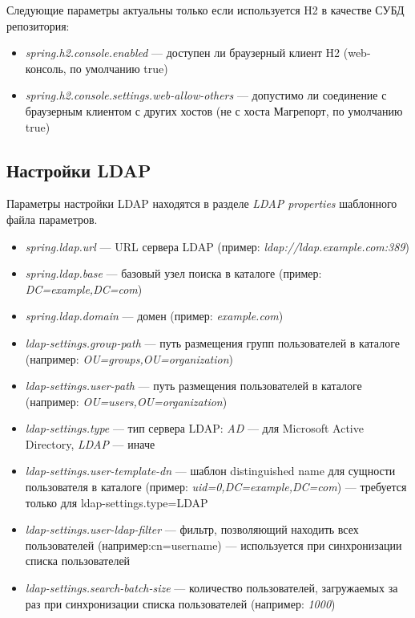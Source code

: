 \documentclass[../user-manual.tex]{subfiles}
\begin{document}
	Следующие параметры актуальны только если используется H2 в качестве СУБД репозитория:
	
	\begin{itemize}
		\item \textit{spring.h2.console.enabled} --- доступен ли браузерный клиент H2 (web-консоль, по умолчанию true)
		\item \textit{spring.h2.console.settings.web-allow-others} --- допустимо ли соединение с браузерным клиентом с других хостов (не с хоста Магрепорт, по умолчанию true)
	\end{itemize}
	
	\subsection{Настройки LDAP}
	
	Параметры настройки LDAP находятся в разделе \textit{LDAP properties} шаблонного файла параметров.
	
	\begin{itemize}
		\item \textit{spring.ldap.url} --- URL сервера LDAP (пример: \textit{ldap://ldap.example.com:389})
		
		\item \textit{spring.ldap.base} --- базовый узел поиска в каталоге (пример: \textit{DC=example,DC=com})
		
		\item \textit{spring.ldap.domain} --- домен (пример: \textit{example.com})
		
		\item \textit{ldap-settings.group-path} --- путь размещения групп пользователей в каталоге (например: \textit{OU=groups,OU=organization})
		
		\item \textit{ldap-settings.user-path} --- путь размещения пользователей в каталоге (например: \textit{OU=users,OU=organization})
		
		\item \textit{ldap-settings.type} --- тип сервера LDAP: \textit{AD} --- для Microsoft Active Directory, \textit{LDAP} --- иначе
		
		\item \textit{ldap-settings.user-template-dn} --- шаблон distinguished name для сущности пользователя в каталоге (пример: \textit{uid={0},DC=example,DC=com}) --- требуется только для ldap-settings.type=LDAP
		
		\item \textit{ldap-settings.user-ldap-filter} --- фильтр, позволяющий находить всех пользователей (например:cn=username) --- используется при синхронизации списка пользователей
		
		\item \textit{ldap-settings.search-batch-size} --- количество пользователей, загружаемых за раз при синхронизации списка пользователей (например: \textit{1000})
		
	\end{itemize}
\end{document}
